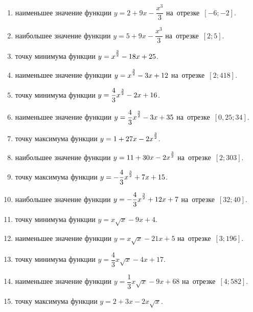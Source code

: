 \documentclass[a4paper,10pt]{article}
\begin{document}
\begin{enumerate}
\item {} наименьшее значение функции $y=2 +9x-\dfrac{x^3}{3}$ на~отрезке~$\left[-6;-2\right]$.

\item {} наибольшее значение функции $y=5 +9x-\dfrac{x^3}{3}$ на~отрезке~$\left[2;5\right]$.

\item {} точку минимума функции $y=x\strut^{\frac{3}{2}} -18x+25$.

\item {} наименьшее значение функции $y=x\strut^{\frac{3}{2}} -3x+12$ на~отрезке~$\left[2;418\right]$.

\item {} точку минимума функции $y=\dfrac{4}{3}x\strut^{\frac{3}{2}} -2x+16$.

\item {} наименьшее значение функции $y=\dfrac{4}{3}x\strut^{\frac{3}{2}} -3x+35$ на~отрезке~$\left[0,25;34\right]$.

\item {} точку максимума функции $y=1+27x-2x\strut^{\frac{3}{2}}$.

\item {} наибольшее значение функции $y=11+30x-2x\strut^{\frac{3}{2}}$ на~отрезке~$\left[2;303\right]$.

\item {} точку максимума функции $y=-\dfrac{4}{3}x\strut^{\frac{3}{2}} +7x+15$.

\item {} наибольшее значение функции $y=-\dfrac{4}{3}x\strut^{\frac{3}{2}} +12x+7$ на~отрезке~$\left[32;40\right]$.

\item {} точку минимума функции $y=x\sqrt{x} -9x+4$.

\item {} наименьшее значение функции $y=x\sqrt{x} -21x+5$ на~отрезке~$\left[3;196\right]$.

\item {} точку минимума функции $y=\dfrac{4}{3}x\sqrt{x} -4x+17$.

\item {} наименьшее значение функции $y=\dfrac{1}{3}x\sqrt{x} -9x+68$ на~отрезке~$\left[4;582\right]$.

\item {} точку максимума функции $y=2+3x -2x\sqrt{x}$.


\end{enumerate}
\end{document}

